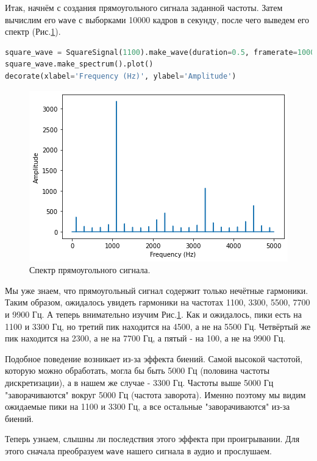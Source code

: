 \documentclass[a4paper, 14pt]{extarticle}
\begin{document}
    Итак, начнём с создания прямоугольного сигнала заданной частоты. Затем вычислим его \texttt{wave} с выборками 10000 кадров в секунду,
    после чего выведем его спектр (Рис.\ref{fig:task3_spectrum}).

    \begin{lstlisting}[language=Python, caption= Создание сигнала и получение его \texttt{wave}., label={lst:task3_create_and_spectrum}]
square_wave = SquareSignal(1100).make_wave(duration=0.5, framerate=10000)
square_wave.make_spectrum().plot()
decorate(xlabel='Frequency (Hz)', ylabel='Amplitude')
    \end{lstlisting}

    \begin{figure}[H]
        \centering
        \includegraphics[width=0.8\linewidth]{resources/Images/task3_spectrum}
        \caption{Спектр прямоугольного сигнала.}
        \label{fig:task3_spectrum}
    \end{figure}

    Мы уже знаем, что прямоугольный сигнал содержит только нечётные гармоники.
    Таким образом, ожидалось увидеть гармоники на частотах 1100, 3300, 5500, 7700 и 9900 Гц.
    А теперь внимательно изучим Рис.\ref{fig:task3_spectrum}. Как и ожидалось, пики есть на 1100 и 3300 Гц, но третий пик
    находится на 4500, а не на 5500 Гц. Четвёртый же пик находится на 2300, а не на 7700 Гц, а пятый - на 100, а не на 9900 Гц.

    Подобное поведение возникает из-за эффекта биений.
    Самой высокой частотой, которую можно обработать, могла бы быть 5000 Гц (половина частоты дискретизации), а в нашем же случае - 3300 Гц.
    Частоты выше 5000 Гц "заворачиваются" вокруг 5000 Гц (частота заворота).
    Именно поэтому мы видим ожидаемые пики на 1100 и 3300 Гц, а все остальные "заворачиваются" из-за биений.

    Теперь узнаем, слышны ли последствия этого эффекта при проигрывании.
    Для этого сначала преобразуем \texttt{wave} нашего сигнала в аудио и прослушаем.
\end{document}
